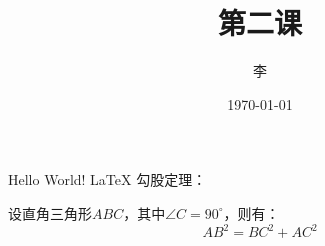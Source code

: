 \documentclass{ctexart}
\title{\heiti 第二课}
\author{\kaishu 李}
\date{\today}
\newcommand\degree{^\circ}
\begin{document}
    \maketitle
    Hello World!
    \LaTeX
    勾股定理：

    设直角三角形$ABC$，其中$\angle C=90\degree$，则有：
    \begin{equation}
        AB^2 = BC^2 + AC^2
    \end{equation}
\end{document}
